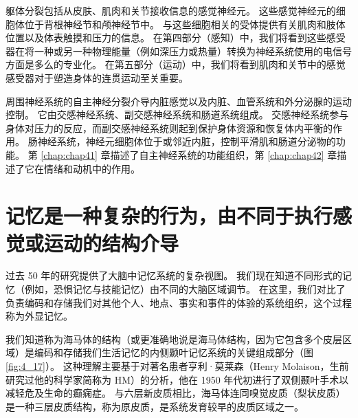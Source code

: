 躯体分裂包括从皮肤、肌肉和关节接收信息的感觉神经元。 
这些感觉神经元的细胞体位于背根神经节和颅神经节中。 与这些细胞相关的受体提供有关肌肉和肢体位置以及体表触摸和压力的信息。 
在第四部分（感知）中，我们将看到这些感受器在将一种或另一种物理能量（例如深压力或热量）转换为神经系统使用的电信号方面是多么的专业化。 
在第五部分（运动）中，我们将看到肌肉和关节中的感觉感受器对于塑造身体的连贯运动至关重要。


周围神经系统的自主神经分裂介导内脏感觉以及内脏、血管系统和外分泌腺的运动控制。 
它由交感神经系统、副交感神经系统和肠道系统组成。 
交感神经系统参与身体对压力的反应，而副交感神经系统则起到保护身体资源和恢复体内平衡的作用。 
肠神经系统，神经元细胞体位于或邻近内脏，控制平滑肌和肠道分泌物的功能。 
第 \ref{chap:chap41} 章描述了自主神经系统的功能组织，第 \ref{chap:chap42} 章描述了它在情绪和动机中的作用。


\section{记忆是一种复杂的行为，由不同于执行感觉或运动的结构介导}
过去 50 年的研究提供了大脑中记忆系统的复杂视图。 
我们现在知道不同形式的记忆（例如，恐惧记忆与技能记忆）由不同的大脑区域调节。 
在这里，我们对比了负责编码和存储我们对其他个人、地点、事实和事件的体验的系统组织，这个过程称为外显记忆。


我们知道称为海马体的结构（或更准确地说是海马体结构，因为它包含多个皮层区域）是编码和存储我们生活记忆的内侧颞叶记忆系统的关键组成部分（图 \ref{fig:4_17}）。 
这种理解主要基于对著名患者亨利·莫莱森（Henry Molaison，生前研究过他的科学家简称为 HM）的分析，他在 1950 年代初进行了双侧颞叶手术以减轻危及生命的癫痫症。 
与六层新皮质相比，海马体连同嗅觉皮质（梨状皮质）是一种三层皮质结构，称为原皮质，是系统发育较早的皮质区域之一。

